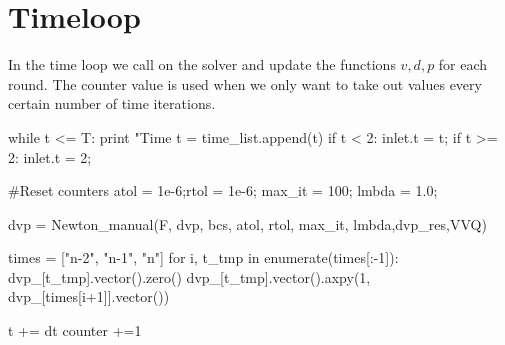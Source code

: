 \section{Timeloop}
In the time loop we call on the solver and update the functions $ v,d,p$ for each round. The counter value is used when we only want to take out values every certain number of time iterations.

\begin{python}

while t <= T:
    print "Time t = %
    time_list.append(t)
    if t < 2:
        inlet.t = t;
    if t >= 2:
        inlet.t = 2;

    #Reset counters
    atol = 1e-6;rtol = 1e-6; max_it = 100; lmbda = 1.0;

    dvp = Newton_manual(F, dvp, bcs, atol, rtol, max_it, lmbda,dvp_res,VVQ)


    times = ["n-2", "n-1", "n"]
    for i, t_tmp in enumerate(times[:-1]):
   	dvp_[t_tmp].vector().zero()
    	dvp_[t_tmp].vector().axpy(1, dvp_[times[i+1]].vector())

    t += dt
    counter +=1
\end{python}



	